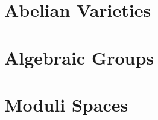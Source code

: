 \documentclass[sectionlevel=book]{noteformyself}
\begin{document}
    \chapter{Abelian Varieties}
        
        

    \chapter{Algebraic Groups}
        
        
        
        

    \chapter{Moduli Spaces}



    \printbibliography[heading=bibintoc, title={References}]
    
\end{document}
